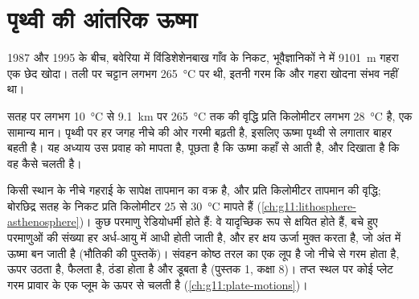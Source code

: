 \chapter{पृथ्वी की आंतरिक ऊष्मा}\label{ch:g12:internal-heat}

1987 और 1995 के बीच, बवेरिया में विंडिशेशेनबाख गाँव के निकट,
भूवैज्ञानिकों ने  में \qty{9101}{m} गहरा एक छेद खोदा। तली पर
चट्टान लगभग \qty{265}{\celsius} पर थी, इतनी गरम कि और गहरा खोदना
संभव नहीं था।

सतह पर लगभग \qty{10}{\celsius} से \qty{9.1}{km} पर \qty{265}{\celsius} तक की
वृद्धि प्रति किलोमीटर लगभग \qty{28}{\celsius} है, एक सामान्य
मान। पृथ्वी पर हर जगह नीचे की ओर गरमी बढ़ती है, इसलिए ऊष्मा
पृथ्वी से लगातार बाहर बहती है। यह अध्याय उस प्रवाह को मापता है, पूछता है कि ऊष्मा
कहाँ से आती है, और दिखाता है कि वह कैसे चलती है।

\begin{recall}
 किसी स्थान के नीचे गहराई के सापेक्ष तापमान का वक्र है, और
 प्रति किलोमीटर तापमान की वृद्धि; बोरछिद्र
सतह के निकट प्रति किलोमीटर 25 से \qty{30}{\celsius} मापते हैं
(\cref{ch:g11:lithosphere-asthenosphere})। कुछ परमाणु रेडियोधर्मी होते हैं: वे
यादृच्छिक रूप से क्षयित होते हैं, बचे हुए परमाणुओं की संख्या हर अर्ध-आयु में आधी होती जाती है, और हर
क्षय ऊर्जा मुक्त करता है, जो अंत में ऊष्मा बन जाती है (भौतिकी की पुस्तकें)।
संवहन कोष्ठ तरल का एक लूप है जो नीचे से गरम होता है, ऊपर उठता है, फैलता है,
ठंडा होता है और डूबता है (पुस्तक 1, कक्षा 8)। तप्त स्थल पर कोई प्लेट गरम प्रावार के
एक प्लूम के ऊपर से चलती है (\cref{ch:g11:plate-motions})।
\end{recall}


